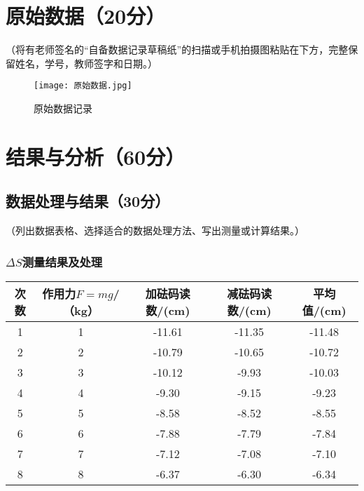\documentclass[]{../template/Report}%
\begin{document}
\begin{fullreportonly}
\section{原始数据（20分）}
（将有老师签名的“自备数据记录草稿纸”的扫描或手机拍摄图粘贴在下方，完整保留姓名，学号，教师签字和日期。）
\begin{figure}[H]
    \centering
    \texttt{[image: 原始数据.jpg]}
    \caption{原始数据记录}
    \label{fig:原始数据记录}
\end{figure}
\section{结果与分析（60分）}
\subsection{数据处理与结果（30分）}
（列出数据表格、选择适合的数据处理方法、写出测量或计算结果。）
\subsubsection{$\Delta S$测量结果及处理}
	\begin{table}[H]
		\centering
		\label{tab:exp_data}
		\begin{tabular}{|c|c|c|c|c|}
			\hline
			\textbf{次数} & \textbf{作用力$F=mg$/（kg）} & \textbf{加砝码读数/(cm)} & \textbf{减砝码读数/(cm)} & \textbf{平均值/(cm)} \\
			\hline
			1 & 1 & -11.61 & -11.35 & -11.48 \\
			\hline
			2 & 2 & -10.79 & -10.65 & -10.72 \\
			\hline
			3 & 3 & -10.12 & -9.93 & -10.03 \\
			\hline
			4 & 4 & -9.30 & -9.15 & -9.23 \\
			\hline
			5 & 5 & -8.58 & -8.52 & -8.55 \\
			\hline
			6 & 6 & -7.88 & -7.79 & -7.84 \\
			\hline
			7 & 7 & -7.12 & -7.08 & -7.10 \\
			\hline
			8 & 8 & -6.37 & -6.30 & -6.34 \\
			\hline
		\end{tabular}
	\end{table}

\end{fullreportonly}
\end{document}
